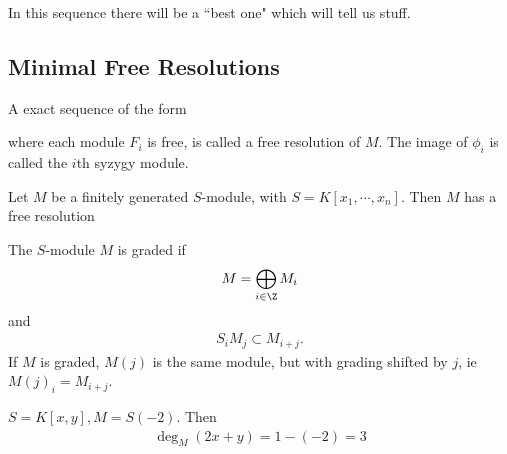 In this sequence there will be a ``best one" which will tell us stuff.

\subsection{Minimal Free Resolutions}

\begin{definition}
    A exact sequence of the form
    \begin{center}
    \end{center}
    where each module $F_i$ is free, is called a free resolution of $M$. The image of $\phi_i$ is called the $i$th syzygy module.
\end{definition}

\begin{theorem}
    Let $M$ be a finitely generated $S$-module, with $S = K [x_1, \cdots , x_n]$. Then $M$ has a free resolution
    \begin{center}
    \end{center}
\end{theorem}

\begin{definition}
    The $S$-module $M$ is graded if
    \begin{align*}
        M = \bigoplus_{i \in \Z} M_i
    \end{align*}
    and 
    \begin{align*}
        S_ i M_j \subset M_{i+j}.
    \end{align*}
    If $M$ is graded, $M(j) $ is the same module, but with grading shifted by $j$, ie $M(j)_i = M_{i+j}$.
\end{definition}

\begin{example}
    $S = K[x,y], M= S(-2)$. Then
    \begin{align*}
        \deg_M (2x + y) = 1 - (-2) = 3
    \end{align*}
\end{example}

